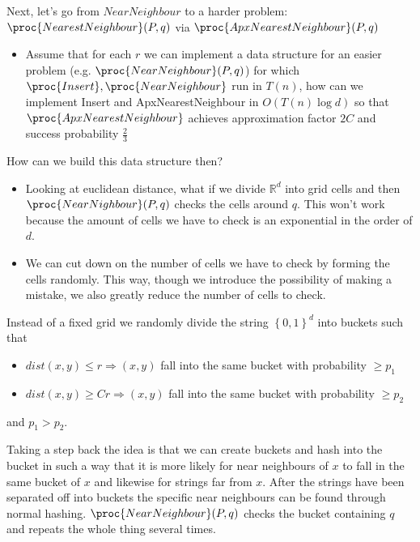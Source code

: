 \documentclass[../notes.tex]{subfiles}
\begin{document}
Next, let's go from $ NearNeighbour $ to a harder problem: $ \proc{NearestNeighbour}(P, q) $ via $ \proc{ApxNearestNeighbour}(P, q) $

\begin{itemize}
    \item  Assume that for each $ r $ we can implement a data structure for an easier problem (e.g. $ \proc{NearNeighbour}(P, q) $) for which $ \proc{Insert}, \proc{NearNeighbour}$ run in $ T(n) $, how can we implement Insert and ApxNearestNeighbour in $ O(T(n)\log d) $ so that $ \proc{ApxNearestNeighbour} $ achieves approximation factor $ 2C $ and success probability $ \frac{2}{3} $
\end{itemize}


How can we build this data structure then? 

\begin{itemize}
    \item Looking at euclidean distance, what if we divide $ \mathbb{R}^d $ into grid cells and then $ \proc{NearNighbour}(P, q)$ checks the cells around $ q $. This won't work because the amount of cells we have to check is an exponential in the order of $ d $.
    \item We can cut down on the number of cells we have to check by forming the cells randomly. This way, though we introduce the possibility of making a mistake, we also greatly reduce the number of cells to check.
\end{itemize}


Instead of a fixed grid we randomly divide the string $ \left\{ 0, 1 \right\} ^d $ into buckets such that
\begin{itemize}
    \item $ dist(x,y) \le  r \Rightarrow  (x,y )$  fall into the same bucket with probability $ \ge p_1 $
    \item $ dist(x,y) \ge Cr \Rightarrow  (x,y )$  fall into the same bucket with probability $ \ge p_2 $
\end{itemize}

and $ p_1 > p_2 $.

Taking a step back the idea is that we can create buckets and hash into the bucket in such a way that it is more likely for near neighbours of $ x $ to fall in the same bucket of $ x $ and likewise for strings far from $ x $. 
After the strings have been separated off into buckets the specific near neighbours can be found through normal hashing. $ \proc{NearNeighbour}(P, q)  $ checks the bucket containing $ q $ and repeats the whole thing several times.
\end{document}

